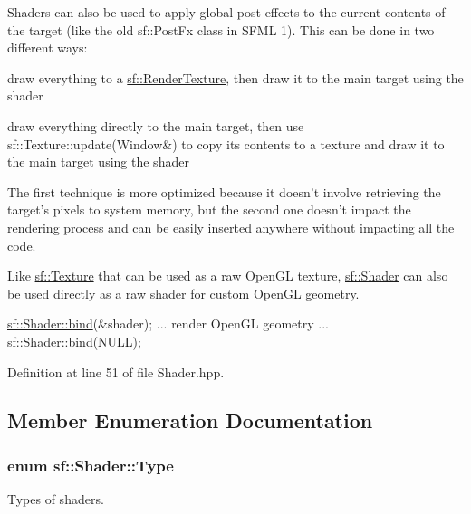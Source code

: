 Shaders can also be used to apply global post-\/effects to the current contents of the target (like the old sf\-::\-Post\-Fx class in S\-F\-M\-L 1). This can be done in two different ways\-: \begin{DoxyItemize}
\item draw everything to a \hyperlink{classsf_1_1RenderTexture}{sf\-::\-Render\-Texture}, then draw it to the main target using the shader \item draw everything directly to the main target, then use sf\-::\-Texture\-::update(\-Window\&) to copy its contents to a texture and draw it to the main target using the shader\end{DoxyItemize}
The first technique is more optimized because it doesn't involve retrieving the target's pixels to system memory, but the second one doesn't impact the rendering process and can be easily inserted anywhere without impacting all the code.

Like \hyperlink{classsf_1_1Texture}{sf\-::\-Texture} that can be used as a raw Open\-G\-L texture, \hyperlink{classsf_1_1Shader}{sf\-::\-Shader} can also be used directly as a raw shader for custom Open\-G\-L geometry. 
\begin{DoxyCode}
\hyperlink{classsf_1_1Shader_a09778f78afcbeb854d608c8dacd8ea30}{sf::Shader::bind}(&shader);
... render OpenGL geometry ...
sf::Shader::bind(NULL);
\end{DoxyCode}
 

Definition at line 51 of file Shader.\-hpp.



\subsection{Member Enumeration Documentation}
\hypertarget{classsf_1_1Shader_afaa1aa65e5de37b74d047da9def9f9b3}{
\subsubsection[{Type}]{\setlength{\rightskip}{0pt plus 5cm}enum {\bf sf\-::\-Shader\-::\-Type}}}\label{classsf_1_1Shader_afaa1aa65e5de37b74d047da9def9f9b3}


Types of shaders. 

